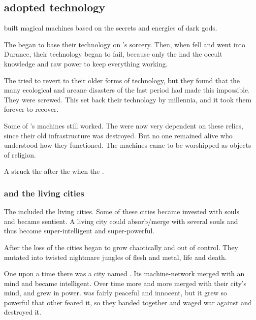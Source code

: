 \subsection{\Ophidians adopted \Sethican technology}
\Sethicus built magical machines based on the secrets and energies of dark gods. 

The \ophidians began to base their technology on \Sethicus's sorcery. 
Then, when \Sethicus fell and went into Durance, their technology began to fail, because only the \dragons had the occult knowledge and raw power to keep everything working. 

The \ophidians tried to revert to their older forms of technology, but they found that the many ecological and arcane disasters of the last period had made this impossible. 
They were screwed. 
This set back their technology by millennia, and it took them forever to recover. 

Some of \Sethicus's machines still worked.
The \ophidians were now very dependent on these relics, since their old infrastructure was destroyed. 
But no one remained alive who understood how they functioned.
The machines came to be worshipped as objects of religion.

A  struck the \ophidians after the \Resphan {} when the \resphain {}. 





\subsubsection{\Nithvezurun and the living cities}
The  included the living cities. 
Some of these cities became invested with \ophidian souls and became sentient. 
A living city could absorb/merge with several \ophidian souls and thus become super-intelligent and super-powerful.

After the loss of \Sethicus the cities began to grow chaotically and out of control.
They mutated into twisted nightmare jungles of flesh and metal, life and death. 

One upon a time there was a city named \Nithvezurun. 
Its machine-network merged with an \ophidian mind and became intelligent. 
Over time more and more \ophidians merged with their city's mind, and \Nithvezurun grew in power. 
\Nithvezurun was fairly peaceful and innocent, but it grew so powerful that other \ophidians feared it, so they banded together and waged war against \Nithvezurun and destroyed it. 

